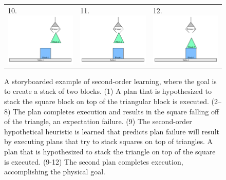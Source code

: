 \begin{figure}
\begin{center}
\begin{tabular}{p{4cm}p{4cm}p{4cm}}
10. \includegraphics[width=4cm]{gfx/blocks_world_example-10} & 11. \includegraphics[width=4cm]{gfx/blocks_world_example-11} & 12. \includegraphics[width=4cm]{gfx/blocks_world_example-12}
\end{tabular}
\end{center}
\caption[A storyboard of the implemented example of second-order
  learning.]{A storyboarded example of second-order learning, where
  the goal is to create a stack of two blocks.  (1) A plan that is
  hypothesized to stack the square block on top of the triangular
  block is executed.  (2--8) The plan completes execution and results
  in the square falling off of the triangle, an expectation failure.
  (9) The second-order hypothetical heuristic is learned that predicts
  plan failure will result by executing plans that try to stack
  squares on top of triangles.  A plan that is hypothesized to stack
  the triangle on top of the square is executed.  (9-12) The second
  plan completes execution, accomplishing the physical goal.}
\label{figure:implemented_example_learning_storyboard}
\end{figure}
